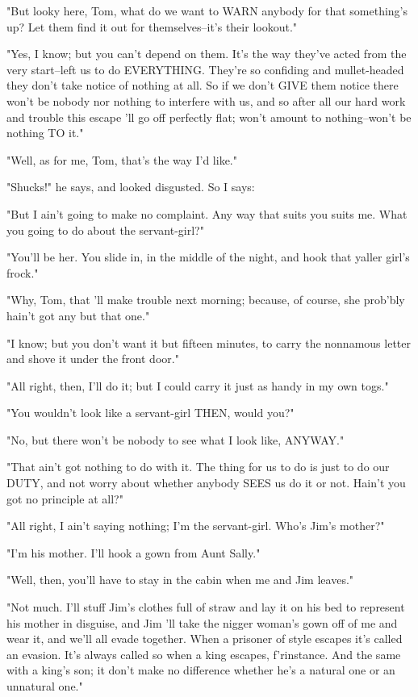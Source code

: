 "But looky here, Tom, what do we want to WARN anybody for that
something's up?  Let them find it out for themselves--it's their
lookout."

"Yes, I know; but you can't depend on them.  It's the way they've acted
from the very start--left us to do EVERYTHING.  They're so confiding and
mullet-headed they don't take notice of nothing at all.  So if we don't
GIVE them notice there won't be nobody nor nothing to interfere with us,
and so after all our hard work and trouble this escape 'll go off
perfectly flat; won't amount to nothing--won't be nothing TO it."

"Well, as for me, Tom, that's the way I'd like."

"Shucks!" he says, and looked disgusted.  So I says:

"But I ain't going to make no complaint.  Any way that suits you suits
me. What you going to do about the servant-girl?"

"You'll be her.  You slide in, in the middle of the night, and hook that
yaller girl's frock."

"Why, Tom, that 'll make trouble next morning; because, of course, she
prob'bly hain't got any but that one."

"I know; but you don't want it but fifteen minutes, to carry the
nonnamous letter and shove it under the front door."

"All right, then, I'll do it; but I could carry it just as handy in my
own togs."

"You wouldn't look like a servant-girl THEN, would you?"

"No, but there won't be nobody to see what I look like, ANYWAY."

"That ain't got nothing to do with it.  The thing for us to do is just to
do our DUTY, and not worry about whether anybody SEES us do it or not.
Hain't you got no principle at all?"

"All right, I ain't saying nothing; I'm the servant-girl.  Who's Jim's
mother?"

"I'm his mother.  I'll hook a gown from Aunt Sally."

"Well, then, you'll have to stay in the cabin when me and Jim leaves."

"Not much.  I'll stuff Jim's clothes full of straw and lay it on his bed
to represent his mother in disguise, and Jim 'll take the nigger woman's
gown off of me and wear it, and we'll all evade together.  When a
prisoner of style escapes it's called an evasion.  It's always called so
when a king escapes, f'rinstance.  And the same with a king's son; it
don't make no difference whether he's a natural one or an unnatural one."

